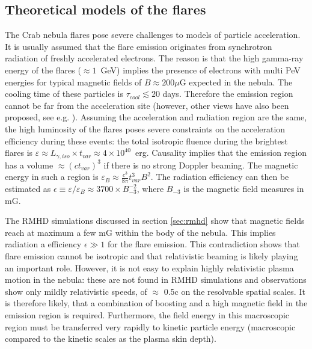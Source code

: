 \subsection{Theoretical models of the flares}

The Crab nebula flares pose severe challenges to models of particle acceleration. It is usually assumed that the flare emission originates from synchrotron radiation of freshly accelerated electrons. The reason is that the high gamma-ray energy of the flares ($\approx 1$~GeV) implies the presence of electrons with multi PeV energies for typical magnetic fields of $B \approx 200 \mu$G expected in the nebula. The cooling time of these particles is $\tau_{cool} \lesssim 20$ days. Therefore the emission region cannot be far from the acceleration site  (however, other views have also been proposed, see e.g. \citet{Bykov_2012,2015arXiv151205426Z}). Assuming the acceleration and radiation region are the same, the high luminosity of the flares poses severe constraints on the acceleration efficiency during these events: the total isotropic fluence during the brightest flares is $\varepsilon \approx L_{\gamma,iso} \times t_{var} \approx 4 \times 10^{40} $~erg. Causality implies that the emission region has a volume $\approx (c t_{var})^3$ if there is no strong Doppler beaming. The magnetic energy in such a region is $\varepsilon_B \approx \frac{c^3}{8 \pi} t_{var}^3 B^2$. The radiation efficiency can then be estimated as $\epsilon \equiv \varepsilon / \varepsilon_B \approx  3700 \times B_{-3}^{-2}$, where $ B_{-3}$ is the magnetic field measures in mG.

The RMHD simulations discussed in section \ref{sec:rmhd} show that magnetic fields reach at maximum a few mG within the body of the nebula. This implies radiation a efficiency $\epsilon \gg 1$ for the flare emission. This contradiction shows that flare emission cannot be isotropic and that relativistic beaming is likely playing an important role. However, it is not easy to explain highly relativistic plasma motion in the nebula: these are not found in RMHD simulations and observations show only mildly relativistic speeds, of $\approx$ 0.5c on the resolvable spatial scales. It is therefore likely, that a combination of boosting and a high magnetic field in the emission region is required. Furthermore, the field energy in this macroscopic region must be transferred very rapidly to kinetic particle energy (macroscopic compared to the kinetic scales as the plasma skin depth). 

